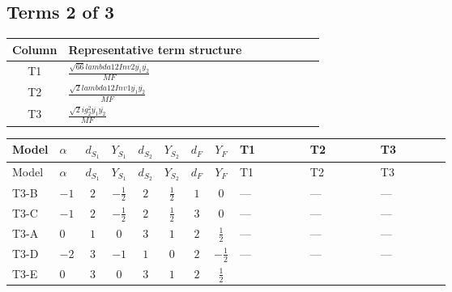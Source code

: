 \documentclass[8pt]{article}
\begin{document}
\begin{landscape}
\subsection*{Terms 2 of 3}
\begin{center}
\begin{tabular}{@{}c >{\raggedright\arraybackslash}p{0.82\linewidth}@{}}
\toprule
Column & Representative term structure \\
\midrule
T1 & \(\displaystyle \frac{\sqrt{66} lambda12Inv2 \overline{y_{1}} \overline{y_{2}}}{MF}\) \\
\midrule
T2 & \(\displaystyle \frac{\sqrt{2} lambda12Inv1 \overline{y_{1}} \overline{y_{2}}}{MF}\) \\
\midrule
T3 & \(\displaystyle \frac{\sqrt{2} i g_{2}^{2} \overline{y_{1}} \overline{y_{2}}}{MF}\) \\
\midrule
\bottomrule
\end{tabular}
\end{center}
\smallskip
\tiny
\begin{longtable}{@{}llcccccc >{\raggedright\arraybackslash}p{0.21\linewidth} >{\raggedright\arraybackslash}p{0.21\linewidth} >{\raggedright\arraybackslash}p{0.21\linewidth}@{}}
\toprule
Model & $\alpha$ & $d_{S_1}$ & $Y_{S_1}$ & $d_{S_2}$ & $Y_{S_2}$ & $d_F$ & $Y_F$ & T1 & T2 & T3 \\
\midrule
\endfirsthead
\toprule
Model & $\alpha$ & $d_{S_1}$ & $Y_{S_1}$ & $d_{S_2}$ & $Y_{S_2}$ & $d_F$ & $Y_F$ & T1 & T2 & T3 \\
\midrule
\endhead
T3-B & $-1$ & $2$ & $-\frac{1}{2}$ & $2$ & $\frac{1}{2}$ & $1$ & $0$ & --- & --- & --- \\
\midrule
T3-C & $-1$ & $2$ & $-\frac{1}{2}$ & $2$ & $\frac{1}{2}$ & $3$ & $0$ & --- & --- & --- \\
\midrule
T3-A & $0$ & $1$ & $0$ & $3$ & $1$ & $2$ & $\frac{1}{2}$ & --- & --- & --- \\
\midrule
T3-D & $-2$ & $3$ & $-1$ & $1$ & $0$ & $2$ & $-\frac{1}{2}$ & --- & --- & --- \\
\midrule
T3-E & $0$ & $3$ & $0$ & $3$ & $1$ & $2$ & $\frac{1}{2}$ & \scriptsize\adjustbox{max width=\linewidth}{$\begin{gathered} - \frac{3 \sqrt{66} lambda12Inv2 \overline{y_{1}} \overline{y_{2}}}{44 MF}\end{gathered}$} & \scriptsize\adjustbox{max width=\linewidth}{$\begin{gathered} \frac{\sqrt{2} lambda12Inv1 \overline{y_{1}} \overline{y_{2}}}{4 MF}\end{gathered}$} & \scriptsize\adjustbox{max width=\linewidth}{$\begin{gathered} \frac{\sqrt{2} i g_{2}^{2} \overline{y_{1}} \overline{y_{2}}}{4 MF}\end{gathered}$} \\
\midrule
\bottomrule
\end{longtable}
\clearpage

\end{landscape}
\end{document}

